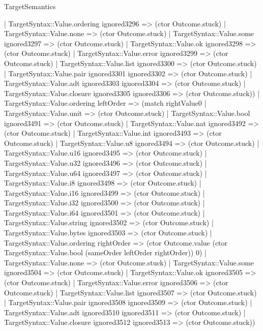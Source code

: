 \begin{lexlean}{TargetSemantics}
\begin{semanticmodule}
{              | TargetSyntax::Value.ordering ignored3296 => (ctor Outcome.stuck)
              | TargetSyntax::Value.none => (ctor Outcome.stuck)
              | TargetSyntax::Value.some ignored3297 => (ctor Outcome.stuck)
              | TargetSyntax::Value.ok ignored3298 => (ctor Outcome.stuck)
              | TargetSyntax::Value.error ignored3299 => (ctor Outcome.stuck)
              | TargetSyntax::Value.list ignored3300 => (ctor Outcome.stuck)
              | TargetSyntax::Value.pair ignored3301 ignored3302 => (ctor Outcome.stuck)
              | TargetSyntax::Value.adt ignored3303 ignored3304 => (ctor Outcome.stuck)
              | TargetSyntax::Value.closure ignored3305 ignored3306 => (ctor Outcome.stuck))
            | TargetSyntax::Value.ordering leftOrder => (match rightValue0
              | TargetSyntax::Value.unit => (ctor Outcome.stuck)
              | TargetSyntax::Value.bool ignored3491 => (ctor Outcome.stuck)
              | TargetSyntax::Value.nat ignored3492 => (ctor Outcome.stuck)
              | TargetSyntax::Value.int ignored3493 => (ctor Outcome.stuck)
              | TargetSyntax::Value.u8 ignored3494 => (ctor Outcome.stuck)
              | TargetSyntax::Value.u16 ignored3495 => (ctor Outcome.stuck)
              | TargetSyntax::Value.u32 ignored3496 => (ctor Outcome.stuck)
              | TargetSyntax::Value.u64 ignored3497 => (ctor Outcome.stuck)
              | TargetSyntax::Value.i8 ignored3498 => (ctor Outcome.stuck)
              | TargetSyntax::Value.i16 ignored3499 => (ctor Outcome.stuck)
              | TargetSyntax::Value.i32 ignored3500 => (ctor Outcome.stuck)
              | TargetSyntax::Value.i64 ignored3501 => (ctor Outcome.stuck)
              | TargetSyntax::Value.string ignored3502 => (ctor Outcome.stuck)
              | TargetSyntax::Value.bytes ignored3503 => (ctor Outcome.stuck)
              | TargetSyntax::Value.ordering rightOrder => (ctor Outcome.value (ctor TargetSyntax::Value.bool (sameOrder leftOrder rightOrder)) 0)
              | TargetSyntax::Value.none => (ctor Outcome.stuck)
              | TargetSyntax::Value.some ignored3504 => (ctor Outcome.stuck)
              | TargetSyntax::Value.ok ignored3505 => (ctor Outcome.stuck)
              | TargetSyntax::Value.error ignored3506 => (ctor Outcome.stuck)
              | TargetSyntax::Value.list ignored3507 => (ctor Outcome.stuck)
              | TargetSyntax::Value.pair ignored3508 ignored3509 => (ctor Outcome.stuck)
              | TargetSyntax::Value.adt ignored3510 ignored3511 => (ctor Outcome.stuck)
              | TargetSyntax::Value.closure ignored3512 ignored3513 => (ctor Outcome.stuck))
}
\end{semanticmodule}
\end{lexlean}
